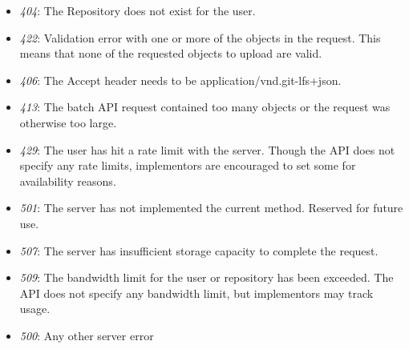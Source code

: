 \begin{itemize}
\begin{itemize}
              \item \textit{404}: The Repository does not exist for the user.
              \item \textit{422}: Validation error with one or more of the objects in the request. This means that none of the requested objects to upload are valid.
              \item \textit{406}: The Accept header needs to be application/vnd.git-lfs+json.
              \item \textit{413}: The batch API request contained too many objects or the request was otherwise too large.
              \item \textit{429}: The user has hit a rate limit with the server. Though the API does not specify any rate limits, implementors are encouraged to set some for availability reasons.
              \item \textit{501}: The server has not implemented the current method. Reserved for future use.
              \item \textit{507}: The server has insufficient storage capacity to complete the request.
              \item \textit{509}: The bandwidth limit for the user or repository has been exceeded. The API does not specify any bandwidth limit, but implementors may track usage.
              \item \textit{500}: Any other server error
          \end{itemize}
\end{itemize}
